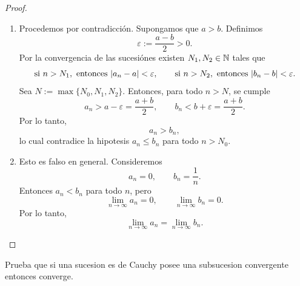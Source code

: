 \documentclass[12pt,a4paper]{article}
\begin{document}
    \begin{proof}
        \begin{enumerate}
            \item[(a)]
            Procedemos por contradicción. Supongamos que $a\gt b$. Definimos
            \begin{equation*}
                \varepsilon:=\frac{a-b}{2}\gt0.
            \end{equation*}
            Por la convergencia de las sucesiónes existen $N_{1},N_{2}\in\mathbb{N}$ tales que
            \begin{equation*}
                \text{si }n> N_{1},\text{ entonces }\abs{a_{n}-a}<\varepsilon,\qquad \text{si }n> N_{2},\text{ entonces }\abs{b_{n}-b}<\varepsilon.
            \end{equation*}
            Sea $N:=\max\{N_{0},N_{1},N_{2}\}$. Entonces, para todo $n\gt N$, se cumple
            \begin{equation*}
                a_{n}\gt a-\varepsilon=\frac{a+b}{2},\qquad b_{n}\lt b+\varepsilon=\frac{a+b}{2}.
            \end{equation*}
            Por lo tanto,
            \begin{equation*}
                a_{n}\gt b_{n},
            \end{equation*}
            lo cual contradice la hipotesis $a_{n}\leq b_{n}$ para todo $n\gt N_{0}$.
            \item[(b)]
            Esto es falso en general. Consideremos
            \begin{equation*}
                a_{n}=0,\qquad b_{n}=\frac{1}{n}.
            \end{equation*}
            Entonces $a_{n}\lt b_{n}$ para todo $n$, pero
            \begin{equation*}
                \lim_{n\to\infty}a_{n}=0,\qquad \lim_{n\to\infty}b_{n}=0.
            \end{equation*}
            Por lo tanto,
            \begin{equation*}
                \lim_{n\to\infty}a_{n}=\lim_{n\to\infty}b_{n}.
            \end{equation*}
        \end{enumerate}
    \end{proof}

    \begin{mdframed}[style=mdpinkbox,frametitle={Ejercicio 3}]
        Prueba que si una sucesion es de Cauchy posee una subsucesion convergente entonces converge.
    \end{mdframed}
\end{document}
